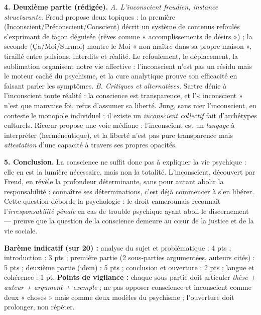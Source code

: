 \documentclass[11pt]{article}
\begin{document}
\begin{corrige}
\textbf{4. Deuxième partie (rédigée).} \emph{A. L'inconscient freudien, instance structurante.} Freud propose deux topiques : la première (Inconscient/Préconscient/Conscient) décrit un système de contenus refoulés s'exprimant de façon déguisée (rêves comme « accomplissements de désirs ») ; la seconde (Ça/Moi/Surmoi) montre le Moi « non maître dans sa propre maison », tiraillé entre pulsions, interdits et réalité. Le refoulement, le déplacement, la sublimation organisent notre vie affective : l'inconscient n'est pas un résidu mais le moteur caché du psychisme, et la cure analytique prouve son efficacité en faisant parler les symptômes. \emph{B. Critiques et alternatives.} Sartre dénie à l'inconscient toute réalité : la conscience est transparence, et l'« inconscient » n'est que mauvaise foi, refus d'assumer sa liberté. Jung, sans nier l'inconscient, en conteste le monopole individuel : il existe un \emph{inconscient collectif} fait d'archétypes culturels. Ricœur propose une voie médiane : l'inconscient est un \emph{langage} à interpréter (herméneutique), et la liberté n'est pas pure transparence mais \emph{attestation} d'une capacité à travers ses propres opacités.

\textbf{5. Conclusion.} La conscience ne suffit donc pas à expliquer la vie psychique : elle en est la lumière nécessaire, mais non la totalité. L'inconscient, découvert par Freud, en révèle la profondeur déterminante, sans pour autant abolir la responsabilité : connaître ses déterminations, c'est déjà commencer à s'en libérer. Cette question déborde la psychologie : le droit camerounais reconnaît l'\emph{irresponsabilité pénale} en cas de trouble psychique ayant aboli le discernement — preuve que la question de la conscience demeure au cœur de la justice et de la vie sociale.

\textbf{Barème indicatif (sur 20) :} analyse du sujet et problématique : 4 pts ; introduction : 3 pts ; première partie (2 sous-parties argumentées, auteurs cités) : 5 pts ; deuxième partie (idem) : 5 pts ; conclusion et ouverture : 2 pts ; langue et cohérence : 1 pt.
\textbf{Points de vigilance :} chaque sous-partie doit articuler \emph{thèse + auteur + argument + exemple} ; ne pas opposer conscience et inconscient comme deux « choses » mais comme deux modèles du psychisme ; l'ouverture doit prolonger, non répéter.
\end{corrige}
\end{document}
